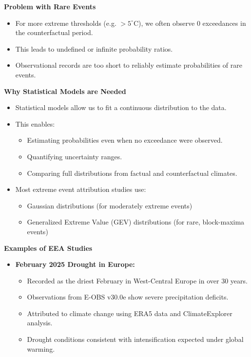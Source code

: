 \documentclass[fontsize=8pt, a4paper, landscape, fleqn]{scrartcl}
\renewcommand{\subsection}[1]{%
    \noindent\colorbox{subsectioncolor}{%
        \parbox{\dimexpr\columnwidth-2\fboxsep}{\color{white}\textbf{#1}}}%
    \vspace{0.5mm}%
}
\begin{document}
\begin{multicols*}{3}[\raggedcolumns]
\subsection{Problem with Rare Events}
\begin{itemize}
    \item For more extreme thresholds (e.g. $>5^{\circ}$C), we often observe 0 exceedances in the counterfactual period.
    \item This leads to undefined or infinite probability ratios.
    \item Observational records are too short to reliably estimate probabilities of rare events.
\end{itemize}

\subsection{Why Statistical Models are Needed}
\begin{itemize}
    \item Statistical models allow us to fit a continuous distribution to the data.
    \item This enables:
    \begin{itemize}
        \item Estimating probabilities even when no exceedance were observed.
        \item Quantifying uncertainty ranges.
        \item Comparing full distributions from factual and counterfactual climates.
    \end{itemize}
    \item Most extreme event attribution studies use:
    \begin{itemize}
        \item Gaussian distributions (for moderately extreme events)
        \item Generalized Extreme Value (GEV) distributions (for rare, block-maxima events)
    \end{itemize}
\end{itemize}

\subsection{Examples of EEA Studies}

\begin{itemize}
    \item \textbf{February 2025 Drought in Europe:}
    \begin{itemize}
        \item Recorded as the driest February in West-Central Europe in over 30 years.
        \item Observations from E-OBS v30.0e show severe precipitation deficits.
        \item Attributed to climate change using ERA5 data and ClimateExplorer analysis.
        \item Drought conditions consistent with intensification expected under global warming.
    \end{itemize}


\end{itemize}
\end{multicols*}
\end{document}

